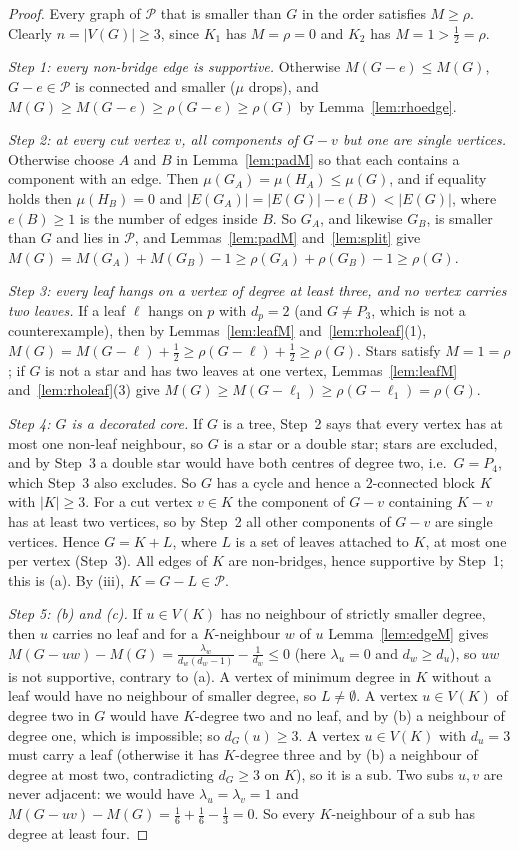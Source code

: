 \documentclass[11pt]{amsart}
\theoremstyle{definition}
\begin{document}
\begin{proof}
Every graph of $\mathcal P$ that is smaller than $G$ in the order satisfies $M\ge\rho$. Clearly $n=|V(G)|\ge3$, since
$K_1$ has $M=\rho=0$ and $K_2$ has $M=1>\frac12=\rho$.

\emph{Step 1: every non-bridge edge is supportive.} Otherwise $M(G-e)\le M(G)$, $G-e\in\mathcal P$ is connected and
smaller ($\mu$ drops), and $M(G)\ge M(G-e)\ge\rho(G-e)\ge\rho(G)$ by Lemma~\ref{lem:rhoedge}.

\emph{Step 2: at every cut vertex $v$, all components of $G-v$ but one are single vertices.}
Otherwise choose $A$ and $B$ in Lemma~\ref{lem:padM} so that each contains a component with an edge.
Then $\mu(G_A)=\mu(H_A)\le\mu(G)$, and if equality holds then $\mu(H_B)=0$ and
$|E(G_A)|=|E(G)|-e(B)<|E(G)|$, where $e(B)\ge1$ is the number of edges inside $B$. So $G_A$, and
likewise $G_B$, is smaller than $G$ and lies in $\mathcal P$, and Lemmas~\ref{lem:padM} and~\ref{lem:split} give
$M(G)=M(G_A)+M(G_B)-1\ge\rho(G_A)+\rho(G_B)-1\ge\rho(G)$.

\emph{Step 3: every leaf hangs on a vertex of degree at least three, and no vertex carries two leaves.}
If a leaf $\ell$ hangs on $p$ with $d_p=2$ (and $G\ne P_3$, which is not a counterexample), then by
Lemmas~\ref{lem:leafM} and~\ref{lem:rholeaf}(1), $M(G)=M(G-\ell)+\frac12\ge\rho(G-\ell)+\frac12\ge\rho(G)$.
Stars satisfy $M=1=\rho$; if $G$ is not a star and has two leaves at one vertex, Lemmas~\ref{lem:leafM}
and~\ref{lem:rholeaf}(3) give $M(G)\ge M(G-\ell_1)\ge\rho(G-\ell_1)=\rho(G)$.

\emph{Step 4: $G$ is a decorated core.} If $G$ is a tree, Step~2 says that every vertex has at most one non-leaf
neighbour, so $G$ is a star or a double star; stars are excluded, and by Step~3 a double star would
have both centres of degree two, i.e.\ $G=P_4$, which Step~3 also excludes. So $G$ has a cycle and hence a
$2$-connected block $K$ with $|K|\ge3$. For a cut vertex $v\in K$ the component of $G-v$ containing
$K-v$ has at least two vertices, so by Step~2 all other components of $G-v$ are single vertices. Hence
$G=K+L$, where $L$ is a set of leaves attached to $K$, at most one per vertex (Step~3). All edges of $K$ are
non-bridges, hence supportive by Step~1; this is (a). By (iii), $K=G-L\in\mathcal P$.

\emph{Step 5: (b) and (c).} If $u\in V(K)$ has no neighbour of strictly smaller degree, then $u$ carries no leaf and
for a $K$-neighbour $w$ of $u$ Lemma~\ref{lem:edgeM} gives
$M(G-uw)-M(G)=\frac{\lambda_w}{d_w(d_w-1)}-\frac1{d_w}\le0$ (here $\lambda_u=0$ and $d_w\ge d_u$), so $uw$
is not supportive, contrary to (a). A vertex of minimum degree in $K$ without a leaf would have no neighbour of
smaller degree, so $L\ne\emptyset$. A vertex $u\in V(K)$ of degree two in $G$ would have $K$-degree two and no leaf,
and by (b) a neighbour of degree one, which is impossible; so $d_G(u)\ge3$. A vertex $u\in V(K)$ with $d_u=3$ must
carry a leaf (otherwise it has $K$-degree three and by (b) a neighbour of degree at most two, contradicting
$d_G\ge3$ on $K$), so it is a sub. Two subs $u,v$ are never adjacent: we would have $\lambda_u=\lambda_v=1$ and
$M(G-uv)-M(G)=\frac16+\frac16-\frac13=0$. So every $K$-neighbour of a sub has degree at least four.


\end{proof}
\end{document}
